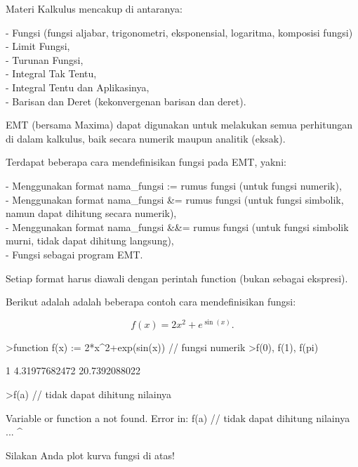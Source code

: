 \documentclass[a4paper,10pt]{article}
\begin{document}
\begin{eulernotebook}
\begin{eulercomment}
Materi Kalkulus mencakup di antaranya:

- Fungsi (fungsi aljabar, trigonometri, eksponensial, logaritma,
komposisi fungsi)\\
- Limit Fungsi,\\
- Turunan Fungsi,\\
- Integral Tak Tentu,\\
- Integral Tentu dan Aplikasinya,\\
- Barisan dan Deret (kekonvergenan barisan dan deret).

EMT (bersama Maxima) dapat digunakan untuk melakukan semua perhitungan
di dalam kalkulus, baik secara numerik maupun analitik (eksak).

\end{eulercomment}
\begin{eulercomment}
Terdapat beberapa cara mendefinisikan fungsi pada EMT, yakni:

- Menggunakan format nama\_fungsi := rumus fungsi (untuk fungsi
numerik),\\
- Menggunakan format nama\_fungsi \&= rumus fungsi (untuk fungsi
simbolik, namun dapat dihitung secara numerik),\\
- Menggunakan format nama\_fungsi \&\&= rumus fungsi (untuk fungsi
simbolik murni, tidak dapat dihitung langsung),\\
- Fungsi sebagai program EMT.

Setiap format harus diawali dengan perintah function (bukan sebagai
ekspresi).

Berikut adalah adalah beberapa contoh cara mendefinisikan fungsi:

\end{eulercomment}
\begin{eulerformula}
\[
f(x)=2x^2+e^{\sin(x)}.
\]
\end{eulerformula}
\begin{eulerprompt}
>function f(x) := 2*x^2+exp(sin(x)) // fungsi numerik
>f(0), f(1), f(pi)
\end{eulerprompt}
\begin{euleroutput}
  1
  4.31977682472
  20.7392088022
\end{euleroutput}
\begin{eulerprompt}
>f(a) // tidak dapat dihitung nilainya
\end{eulerprompt}
\begin{euleroutput}
  Variable or function a not found.
  Error in:
  f(a) // tidak dapat dihitung nilainya ...
     ^
\end{euleroutput}
\begin{eulercomment}
Silakan Anda plot kurva fungsi di atas!


\end{eulercomment}
\end{eulernotebook}
\end{document}
